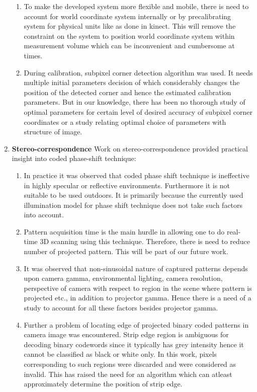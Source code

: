 \begin{enumerate}
\begin{enumerate}
\item To make the developed system more flexible and mobile, there is need to account for world coordinate system internally or by precalibrating system for physical units like as done in kinect. This will remove the constraint on the system to position world coordinate system within measurement volume which can be inconvenient and cumbersome at times.  

\item During calibration, subpixel corner detection algorithm was used. It needs multiple initial parameters decision of which considerably changes the position of the detected corner and hence the estimated calibration parameters. But in our knowledge, there has been no thorough study of optimal parameters for certain level of desired accuracy of subpixel corner coordinates or a study relating optimal choice of parameters with structure of image.
\end{enumerate}


  

\item \textbf{Stereo-correspondence} \newline
Work on stereo-correspondence provided practical insight into coded phase-shift technique:
\begin{enumerate}
\item In practice it was observed that coded phase shift technique is ineffective in highly specular or reflective environments. Furthermore it is not suitable to be used outdoors. It is primarily because the currently used illumination model for phase shift technique does not take such factors into account.

\item Pattern acquisition time is the main hurdle in allowing one to do real-time 3D scanning using this technique. Therefore, there is need to reduce number of projected pattern. This will be part of our future work.

\item It was observed that non-sinusoidal nature of captured patterns depends upon camera gamma, environmental lighting, camera resolution, perspective of camera with respect to region in the scene where pattern is projected etc., in addition to projector gamma. Hence there is a need of a study to account for all these factors besides projector gamma.

\item Further a problem of locating edge of projected binary coded patterns in camera image was encountered. Strip edge region is ambiguous for decoding binary codewords since it typically has grey intensity hence it cannot be classified as black or white only. In this work, pixels corresponding to such regions were discarded and were considered as invalid. This has raised the need for an algorithm which can atleast approximately determine the position of strip edge.  


\end{enumerate}
\end{enumerate}
